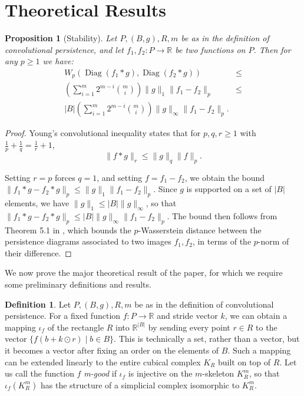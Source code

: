 \documentclass[conference]{IEEEtran}
\newtheorem{prop}[theorem]{Proposition}
\theoremstyle{definition}
\newtheorem{definition}[theorem]{Definition}
\numberwithin{figure}{section}
\begin{document}
\section{Theoretical Results}

\begin{prop}[Stability]
	Let $P,(B,g),R,m$ be as in the definition of convolutional persistence, and let $f_1,f_2: P \to \mathbb{R}$ be two functions on $P$. Then for any $p\geq 1$ we have:
	\begin{align*}
	W_{p}(\operatorname{Diag}(f_1 \ast g),\operatorname{Diag}(f_2 \ast g)) & \leq\\ \left(\sum_{i=1}^{m} 2^{m-i} {m \choose i}\right)\|g\|_{1} \|f_1 - f_2\|_{p} & \leq\\ |B| \left(\sum_{i=1}^{m} 2^{m-i} {m \choose i}\right)\|g\|_{\infty} \|f_1 - f_2\|_{p}.
	\end{align*}
	
	
\end{prop}
\begin{proof}
	Young's convolutional inequality states that for $p,q,r \geq 1$ with $\frac{1}{p} + \frac{1}{q} = \frac{1}{r} + 1$,
	\[\|f \ast g\|_{r} \leq  \|g\|_{q} \|f\|_{p}.\]
	
	Setting $r=p$ forces $q=1$, and setting $f = f_1 - f_2$, we obtain the bound $\|f_1 \ast g - f_2 \ast g\|_{p} \leq \|g\|_{1}\|f_1 - f_2\|_{p}$. Since $g$ is supported on a set of $|B|$ elements, we have $\|g\|_{1} \leq |B|\|g\|_{\infty}$, so that $\|f_1 \ast g - f_2 \ast g\|_{p} \leq |B| \|g\|_{\infty}\|f_1 - f_2\|_{p}$. The bound then follows from Theorem 5.1 in \cite{skraba2020wasserstein}, which bounds the $p$-Wasserstein distance between the persistence diagrams associated to two images $f_1,f_2$, in terms of the $p$-norm of their difference.
\end{proof}

We now prove the major theoretical result of the paper, for which we require some preliminary definitions and results.

\begin{definition}
Let $P,(B,g),R,m$ be as in the definition of convolutional persistence. For a fixed function $f:P \to \mathbb{R}$ and stride vector $k$, we can obtain a mapping $\iota_{f}$ of the rectangle $R$ into $\mathbb{R}^{|B|}$ by sending every point $r \in R$ to the vector $\{f(b + k \odot r) \mid b \in B\}$. This is technically a set, rather than a vector, but it becomes a vector after fixing an order on the elements of $B$. Such a mapping can be extended linearly to the entire cubical complex $K_{R}$ built on top of $R$. Let us call the function $f$ \emph{m-good} if $\iota_{f}$ is injective on the $m$-skeleton $K_{R}^m$, so that $\iota_{f}(K_{R}^m)$ has the structure of a simplicial complex isomorphic to $K_{R}^m$.
\end{definition}
\end{document}
